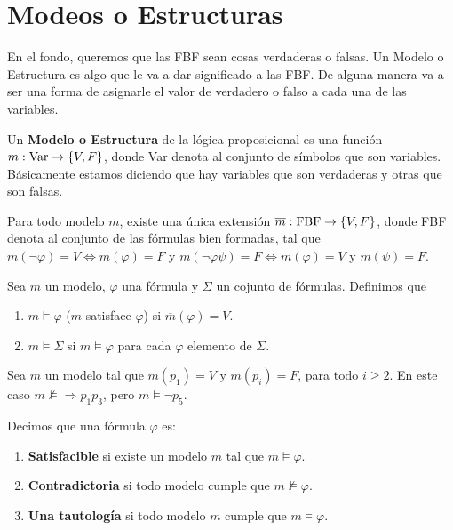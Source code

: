 \documentclass[12pt]{report}
\theoremstyle{largebreak}
\newcommand\cf[3]{\ensuremath{#1:#2\rightarrow#3}}
\begin{document}
    \section{Modeos o Estructuras}

    En el fondo, queremos que las FBF sean cosas verdaderas o falsas. Un Modelo o Estructura es algo que le va a dar significado a las FBF. De alguna manera va a ser una forma de asignarle el valor de verdadero o falso a cada una de las variables.

    \begin{mydef}
        Un \textbf{Modelo o Estructura} de la lógica proposicional es una función $\cf{m}{\textup{Var}}{\left\{V,F\right\}}$, donde Var denota al conjunto de símbolos que son variables. Básicamente estamos diciendo que hay variables que son verdaderas y otras que son falsas.
    \end{mydef}

    \begin{theor}
        Para todo modelo $m$, existe una única extensión $\cf{\overline{m}}{\textup{FBF}}{\left\{V,F\right\}}$, donde FBF denota al conjunto de las fórmulas bien formadas, tal que $\overline{m}(\neg\varphi)=V\iff \overline{m}(\varphi)=F$ y $\overline{m}(\neg\varphi\psi)=F\iff\overline{m}(\varphi)=V$ y $\overline{m}(\psi)=F$.
    \end{theor}

    \begin{mydef}
        Sea $m$ un modelo, $\varphi$ una fórmula y $\Sigma$ un cojunto de fórmulas. Definimos que
        \begin{enumerate}
            \item $m\vDash \varphi$ ($m$ satisface $\varphi$) si $\overline{m}(\varphi)=V$.
            \item $m\vDash \Sigma$ si $m\vDash\varphi$ para cada $\varphi$ elemento de $\Sigma$.
        \end{enumerate}
    \end{mydef}

    \begin{exa}
        Sea $m$ un modelo tal que $m(p_1)=V$ y $m(p_i)=F$, para todo $i\geq2$. En este caso $m\nvDash \Rightarrow p_1p_3$, pero $m\vDash \neg p_5$.
    \end{exa}
    
    \begin{mydef}
        Decimos que una fórmula $\varphi$ es:
        \begin{enumerate}
            \item \textbf{Satisfacible} si existe un modelo $m$ tal que $m\vDash\varphi$.
            \item \textbf{Contradictoria} si todo modelo cumple que $m\nvDash\varphi$.
            \item \textbf{Una tautología} si todo modelo $m$ cumple que $m\vDash\varphi$.
        \end{enumerate}
    \end{mydef}
\end{document}
